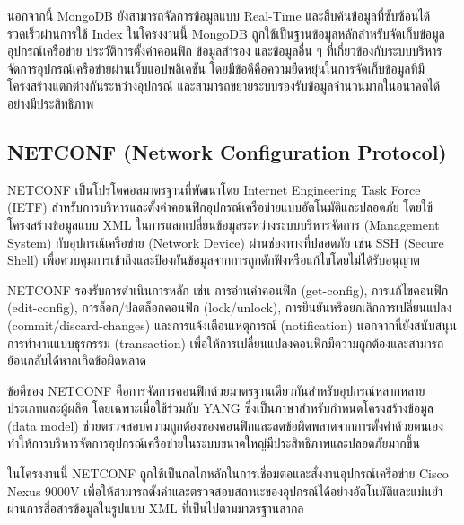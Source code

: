 \hspace*{1.3em} %
นอกจากนี้ MongoDB ยังสามารถจัดการข้อมูลแบบ Real-Time และสืบค้นข้อมูลที่ซับซ้อนได้รวดเร็วผ่านการใช้ Index ในโครงงานนี้ MongoDB ถูกใช้เป็นฐานข้อมูลหลักสำหรับจัดเก็บข้อมูลอุปกรณ์เครือข่าย ประวัติการตั้งค่าคอนฟิก ข้อมูลสำรอง และข้อมูลอื่น ๆ ที่เกี่ยวข้องกับระบบบริหารจัดการอุปกรณ์เครือข่ายผ่านเว็บแอปพลิเคชัน โดยมีข้อดีคือความยืดหยุ่นในการจัดเก็บข้อมูลที่มีโครงสร้างแตกต่างกันระหว่างอุปกรณ์ และสามารถขยายระบบรองรับข้อมูลจำนวนมากในอนาคตได้อย่างมีประสิทธิภาพ \parencite{mongodb}

\hspace*{1.3em} %

\hspace*{1.3em} %

\hspace*{1.3em} %

\subsection{NETCONF (Network Configuration Protocol)}

\hspace*{1.3em} %
NETCONF เป็นโปรโตคอลมาตรฐานที่พัฒนาโดย Internet Engineering Task Force (IETF) สำหรับการบริหารและตั้งค่าคอนฟิกอุปกรณ์เครือข่ายแบบอัตโนมัติและปลอดภัย โดยใช้โครงสร้างข้อมูลแบบ XML ในการแลกเปลี่ยนข้อมูลระหว่างระบบบริหารจัดการ (Management System) กับอุปกรณ์เครือข่าย (Network Device) ผ่านช่องทางที่ปลอดภัย เช่น SSH (Secure Shell) เพื่อควบคุมการเข้าถึงและป้องกันข้อมูลจากการถูกดักฟังหรือแก้ไขโดยไม่ได้รับอนุญาต

\hspace*{1.3em} %
NETCONF รองรับการดำเนินการหลัก เช่น การอ่านค่าคอนฟิก (get-config), การแก้ไขคอนฟิก (edit-config), การล็อก/ปลดล็อกคอนฟิก (lock/unlock), การยืนยันหรือยกเลิกการเปลี่ยนแปลง (commit/discard-changes) และการแจ้งเตือนเหตุการณ์ (notification) นอกจากนี้ยังสนับสนุนการทำงานแบบธุรกรรม (transaction) เพื่อให้การเปลี่ยนแปลงคอนฟิกมีความถูกต้องและสามารถย้อนกลับได้หากเกิดข้อผิดพลาด

\hspace*{1.3em} %
ข้อดีของ NETCONF คือการจัดการคอนฟิกด้วยมาตรฐานเดียวกันสำหรับอุปกรณ์หลากหลายประเภทและผู้ผลิต โดยเฉพาะเมื่อใช้ร่วมกับ YANG ซึ่งเป็นภาษาสำหรับกำหนดโครงสร้างข้อมูล (data model) ช่วยตรวจสอบความถูกต้องของคอนฟิกและลดข้อผิดพลาดจากการตั้งค่าด้วยตนเอง ทำให้การบริหารจัดการอุปกรณ์เครือข่ายในระบบขนาดใหญ่มีประสิทธิภาพและปลอดภัยมากขึ้น

\hspace*{1.3em} %
ในโครงงานนี้ NETCONF ถูกใช้เป็นกลไกหลักในการเชื่อมต่อและสั่งงานอุปกรณ์เครือข่าย Cisco Nexus 9000V เพื่อให้สามารถตั้งค่าและตรวจสอบสถานะของอุปกรณ์ได้อย่างอัตโนมัติและแม่นยำ ผ่านการสื่อสารข้อมูลในรูปแบบ XML ที่เป็นไปตามมาตรฐานสากล\parencite{netconf}

